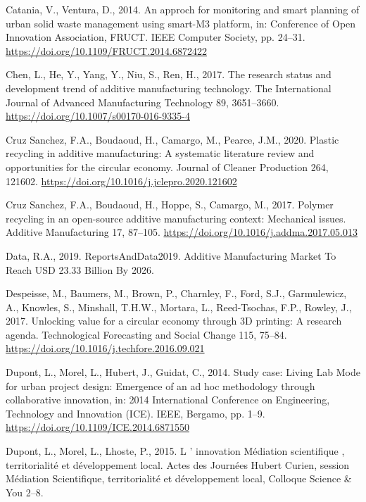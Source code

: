 \documentclass[
  11pt,
]{article}
\newlength{\cslhangindent}
\newlength{\cslentryspacingunit} %
\newenvironment{CSLReferences}[2] %
 {%
  \setlength{\parindent}{0pt}
  \ifodd #1
  \let\oldpar\par
  \def\par{\hangindent=\cslhangindent\oldpar}
  \fi
  \setlength{\parskip}{#2\cslentryspacingunit}
 }%
 {}
\begin{document}
\begin{CSLReferences}{1}{0}
\leavevmode{}%
Catania, V., Ventura, D., 2014. An approch for monitoring and smart
planning of urban solid waste management using smart-{M3} platform, in:
Conference of {Open Innovation Association}, {FRUCT}. {IEEE Computer
Society}, pp. 24--31. \url{https://doi.org/10.1109/FRUCT.2014.6872422}

\leavevmode{}%
Chen, L., He, Y., Yang, Y., Niu, S., Ren, H., 2017. The research status
and development trend of additive manufacturing technology. The
International Journal of Advanced Manufacturing Technology 89,
3651--3660. \url{https://doi.org/10.1007/s00170-016-9335-4}

\leavevmode{}%
Cruz Sanchez, F.A., Boudaoud, H., Camargo, M., Pearce, J.M., 2020.
Plastic recycling in additive manufacturing: {A} systematic literature
review and opportunities for the circular economy. Journal of Cleaner
Production 264, 121602.
\url{https://doi.org/10.1016/j.jclepro.2020.121602}

\leavevmode{}%
Cruz Sanchez, F.A., Boudaoud, H., Hoppe, S., Camargo, M., 2017. Polymer
recycling in an open-source additive manufacturing context: {Mechanical}
issues. Additive Manufacturing 17, 87--105.
\url{https://doi.org/10.1016/j.addma.2017.05.013}

\leavevmode{}%
Data, R.A., 2019. {ReportsAndData2019}. Additive Manufacturing Market To
Reach USD 23.33 Billion By 2026.

\leavevmode{}%
Despeisse, M., Baumers, M., Brown, P., Charnley, F., Ford, S.J.,
Garmulewicz, A., Knowles, S., Minshall, T.H.W., Mortara, L.,
Reed-Tsochas, F.P., Rowley, J., 2017. Unlocking value for a circular
economy through {3D} printing: {A} research agenda. Technological
Forecasting and Social Change 115, 75--84.
\url{https://doi.org/10.1016/j.techfore.2016.09.021}

\leavevmode{}%
Dupont, L., Morel, L., Hubert, J., Guidat, C., 2014. Study case: {Living
Lab Mode} for urban project design: {Emergence} of an ad hoc methodology
through collaborative innovation, in: 2014 {International Conference} on
{Engineering}, {Technology} and {Innovation} ({ICE}). {IEEE}, {Bergamo},
pp. 1--9. \url{https://doi.org/10.1109/ICE.2014.6871550}

\leavevmode{}%
Dupont, L., Morel, L., Lhoste, P., 2015. L ' innovation {Médiation}
scientifique , territorialité et développement local. Actes des Journées
Hubert Curien, session Médiation Scientifique, territorialité et
développement local, Colloque Science \& You 2--8.


\end{CSLReferences}
\end{document}
